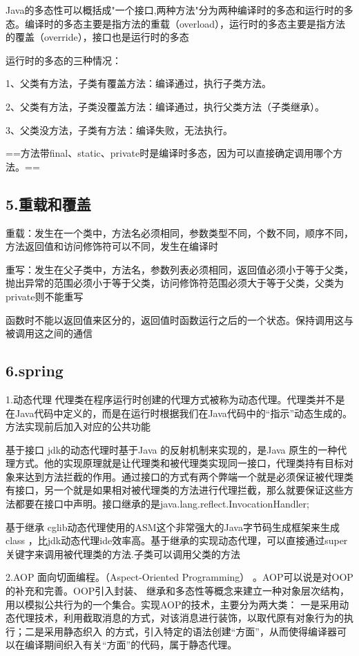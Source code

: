\documentclass[UTF8]{ctexart}
\begin{document}
Java的多态性可以概括成"一个接口,两种方法"分为两种编译时的多态和运行时的多态。编译时的多态主要是指方法的重载（overload），运行时的多态主要是指方法的覆盖（override），接口也是运行时的多态

运行时的多态的三种情况：

1、父类有方法，子类有覆盖方法：编译通过，执行子类方法。

2、父类有方法，子类没覆盖方法：编译通过，执行父类方法（子类继承）。

3、父类没方法，子类有方法：编译失败，无法执行。

==方法带final、static、private时是编译时多态，因为可以直接确定调用哪个方法。==

\subsection{5.重载和覆盖}
重载：发生在一个类中，方法名必须相同，参数类型不同，个数不同，顺序不同，方法返回值和访问修饰符可以不同，发生在编译时

重写：发生在父子类中，方法名，参数列表必须相同，返回值必须小于等于父类，抛出异常的范围必须小于等于父类，访问修饰符范围必须大于等于父类，父类为private则不能重写

函数时不能以返回值来区分的，返回值时函数运行之后的一个状态。保持调用这与被调用这之间的通信

\subsection{6.spring}
1.动态代理
代理类在程序运行时创建的代理方式被称为动态代理。代理类并不是在Java代码中定义的，而是在运行时根据我们在Java代码中的“指示”动态生成的。方法实现前后加入对应的公共功能

基于接口
jdk的动态代理时基于Java 的反射机制来实现的，是Java 原生的一种代理方式。他的实现原理就是让代理类和被代理类实现同一接口，代理类持有目标对象来达到方法拦截的作用。通过接口的方式有两个弊端一个就是必须保证被代理类有接口，另一个就是如果相对被代理类的方法进行代理拦截，那么就要保证这些方法都要在接口中声明。接口继承的是java.lang.reflect.InvocationHandler;

基于继承
cglib动态代理使用的ASM这个非常强大的Java字节码生成框架来生成class ，比jdk动态代理ide效率高。基于继承的实现动态代理，可以直接通过super关键字来调用被代理类的方法.子类可以调用父类的方法

2.AOP
面向切面编程。（Aspect-Oriented Programming） 。AOP可以说是对OOP的补充和完善。OOP引入封装、 继承和多态性等概念来建立一种对象层次结构，用以模拟公共行为的一个集合。实现AOP的技术，主要分为两大类： 一是采用动态代理技术，利用截取消息的方式，对该消息进行装饰，以取代原有对象行为的执行；二是采用静态织入 的方式，引入特定的语法创建“方面”，从而使得编译器可以在编译期间织入有关“方面”的代码，属于静态代理。
\end{document}
